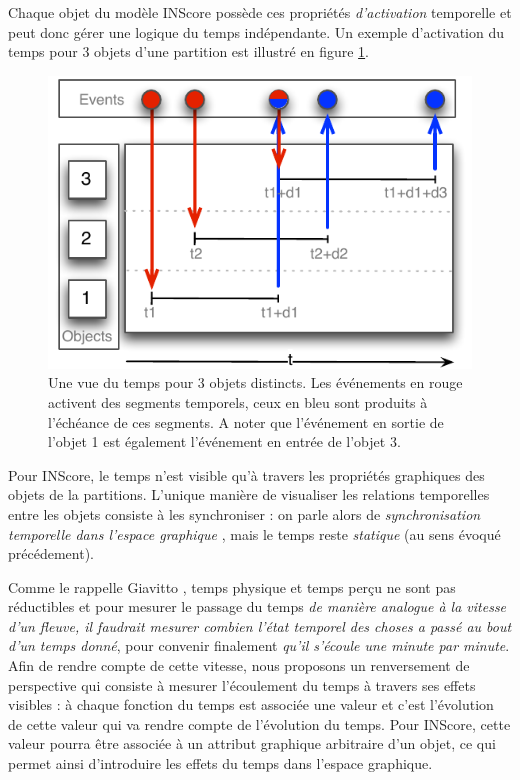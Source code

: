 \documentclass{article}
\begin{document}
Chaque objet du modèle INScore possède ces propriétés \emph{d'activation} temporelle et peut donc gérer une logique du temps indépendante. Un exemple d'activation du temps pour 3 objets d'une partition est illustré en figure \ref{fig:temps}.
  
\begin{figure}[h]
   \centering
   \includegraphics[width=0.95\columnwidth]{imgs/temps}
   \caption{Une vue du temps pour 3 objets distincts. Les événements en rouge activent des segments temporels, ceux en bleu sont produits à l'échéance de ces segments. A noter que l'événement en sortie de l'objet 1 est également l'événement en entrée de l'objet 3.}
   \label{fig:temps}
\end{figure}

Pour INScore, le temps n'est visible qu'à travers les propriétés graphiques des objets de la partitions. L'unique manière de visualiser les relations temporelles entre les objets consiste à les synchroniser : on parle alors de \emph{synchronisation temporelle dans l'espace graphique} \cite{fober:10b}, mais le temps reste \emph{statique} (au sens évoqué précédement). 

Comme le rappelle Giavitto \cite{giavitto:hal-00960989}, temps physique et temps perçu ne sont pas réductibles et pour mesurer le passage du temps \emph{de manière analogue à la vitesse d'un fleuve, il faudrait mesurer combien l'état temporel des choses a passé au bout d'un temps donné}, pour convenir finalement \emph{qu'il s'écoule une minute par minute}. Afin de rendre compte de cette vitesse, nous proposons un renversement de perspective qui consiste à mesurer l'écoulement du temps à travers ses effets visibles : à chaque fonction du temps est associée une valeur et c'est l'évolution de cette valeur qui va rendre compte de l'évolution du temps. Pour INScore, cette valeur pourra être associée à un attribut graphique arbitraire d'un objet, ce qui permet ainsi d'introduire les effets du temps dans l'espace graphique.
\end{document}
